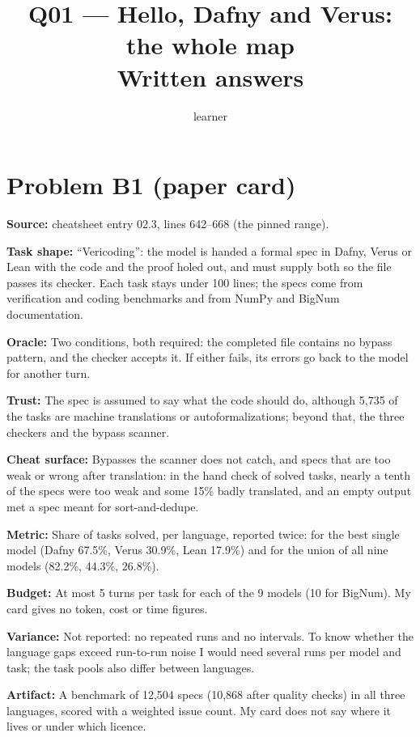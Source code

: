 \documentclass[11pt]{article}
\title{Q01 --- Hello, Dafny and Verus: the whole map \\ \large Written answers}
\author{learner}
\date{}
\begin{document}
\maketitle

\section*{Problem B1 (paper card)}\label{ans:B1}
\begin{answer}
\textbf{Source:} cheatsheet entry 02.3, lines 642--668 (the pinned range).

\textbf{Task shape:} ``Vericoding'': the model is handed a formal spec in
Dafny, Verus or Lean with the code and the proof holed out, and must supply
both so the file passes its checker. Each task stays under 100 lines; the
specs come from verification and coding benchmarks and from NumPy and BigNum
documentation.

\textbf{Oracle:} Two conditions, both required: the completed file contains no
bypass pattern, and the checker accepts it. If either fails, its errors go back
to the model for another turn.

\textbf{Trust:} The spec is assumed to say what the code should do, although
5,735 of the tasks are machine translations or autoformalizations; beyond that,
the three checkers and the bypass scanner.

\textbf{Cheat surface:} Bypasses the scanner does not catch, and specs that are
too weak or wrong after translation: in the hand check of solved tasks, nearly
a tenth of the specs were too weak and some 15\% badly translated, and an empty
output met a spec meant for sort-and-dedupe.

\textbf{Metric:} Share of tasks solved, per language, reported twice: for the
best single model (Dafny 67.5\%, Verus 30.9\%, Lean 17.9\%) and for the union
of all nine models (82.2\%, 44.3\%, 26.8\%).

\textbf{Budget:} At most 5 turns per task for each of the 9 models (10 for
BigNum). My card gives no token, cost or time figures.

\textbf{Variance:} Not reported: no repeated runs and no intervals. To know
whether the language gaps exceed run-to-run noise I would need several runs per
model and task; the task pools also differ between languages.

\textbf{Artifact:} A benchmark of 12,504 specs (10,868 after quality checks) in
all three languages, scored with a weighted issue count. My card does not say
where it lives or under which licence.
\end{answer}
\end{document}
